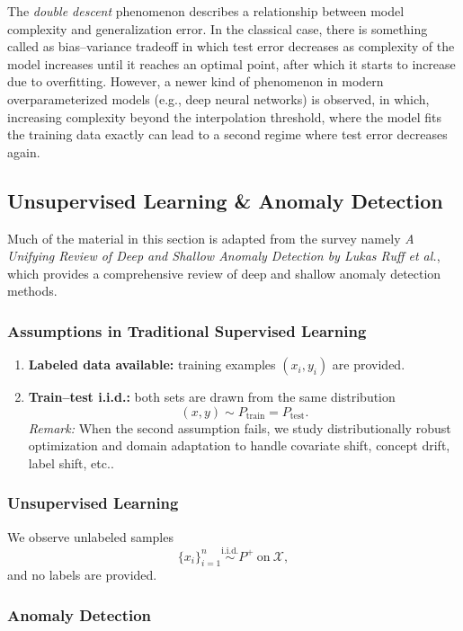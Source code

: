 \documentclass[11pt]{article}
\theoremstyle{plain}
\begin{document}
The \textit{double descent} phenomenon describes a relationship between model complexity and generalization error. 
In the classical case, there is something called as bias--variance tradeoff in which test error decreases as complexity of the model increases until it reaches an optimal point, after which it starts to increase due to overfitting.
However, a newer kind of phenomenon in modern overparameterized models (e.g., deep neural networks) is observed, in which, increasing complexity beyond the interpolation threshold, where the model fits the training data exactly can lead to a second regime where test error decreases again. 


\subsection{Unsupervised Learning \& Anomaly Detection}

Much of the material in this section is adapted from the survey namely \emph{A Unifying Review of Deep and Shallow Anomaly Detection by Lukas Ruff et al.}, which provides a comprehensive review of deep and shallow anomaly detection methods.

\subsubsection{Assumptions in Traditional Supervised Learning}
\begin{enumerate}
  \item \textbf{Labeled data available:} training examples $(x_i,y_i)$ are provided.
  \item \textbf{Train--test i.i.d.:} both sets are drawn from the same distribution
  \[
    (x,y)\sim P_{\text{train}}=P_{\text{test}}.
  \]
  \textit{Remark:} When the second assumption fails, we study distributionally
  robust optimization and domain adaptation to handle covariate shift, concept
  drift, label shift, etc..
\end{enumerate}

\subsubsection{Unsupervised Learning}
We observe unlabeled samples
\[
  \{x_i\}_{i=1}^n \stackrel{\text{i.i.d.}}{\sim} P^{+}\ \text{on}\ \mathcal X,
\]
and no labels are provided.

\subsubsection{Anomaly Detection}
\end{document}
